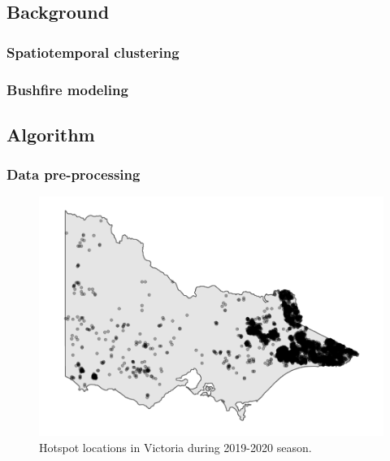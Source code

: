 \hypertarget{background}{%
\subsection{Background}\label{background}}

\hypertarget{spatiotemporal-clustering}{%
\subsubsection{Spatiotemporal
clustering}\label{spatiotemporal-clustering}}

\hypertarget{bushfire-modeling}{%
\subsubsection{Bushfire modeling}\label{bushfire-modeling}}

\hypertarget{algorithm}{%
\subsection{Algorithm}\label{algorithm}}

\hypertarget{data-pre-processing}{%
\subsubsection{Data pre-processing}\label{data-pre-processing}}

\begin{Schunk}
\begin{figure}
\includegraphics[width=0.8\linewidth]{clustering_paper_files/figure-latex/hotspots-1} \caption[Hotspot locations in Victoria during 2019-2020 season]{Hotspot locations in Victoria during 2019-2020 season.}\label{fig:hotspots}
\end{figure}
\end{Schunk}

